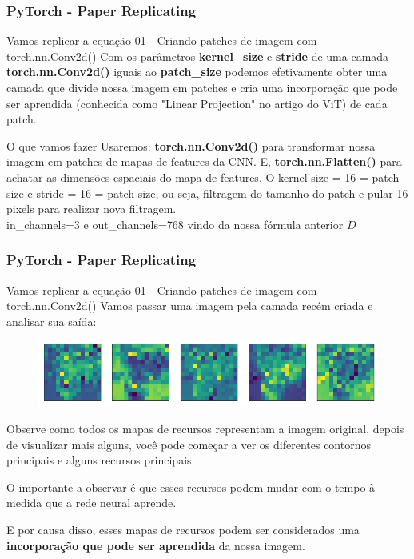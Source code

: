 \documentclass{beamer}
\begin{document}
\begin{frame}
	\frametitle{PyTorch - Paper Replicating}
	\begin{block}{Vamos replicar a equação 01 - Criando patches de imagem com torch.nn.Conv2d()}
		Com os parâmetros \textbf{kernel\_size} e \textbf{stride} de uma camada \textbf{torch.nn.Conv2d()} iguais ao \textbf{patch\_size} podemos efetivamente obter uma camada que divide nossa imagem em patches e cria uma incorporação que pode ser aprendida (conhecida como "Linear Projection" no artigo do ViT) de cada patch.
	\end{block}
	\begin{block}{O que vamos fazer}
		Usaremos: \textbf{torch.nn.Conv2d()} para transformar nossa imagem em patches de mapas de features da CNN. E, \textbf{torch.nn.Flatten()} para achatar as dimensões espaciais do mapa de features. 
		O kernel size  = 16 = patch size e stride = 16 = patch size, ou seja, filtragem do tamanho do patch e pular 16 pixels para realizar nova filtragem. \\
		in\_channels=3 e out\_channels=768 vindo da nossa fórmula anterior $D$
		
	\end{block}
\end{frame}
\begin{frame}
	\frametitle{PyTorch - Paper Replicating}
	\begin{block}{Vamos replicar a equação 01 - Criando patches de imagem com torch.nn.Conv2d()}
		Vamos passar uma imagem pela camada recém criada e analisar sua saída:
		\begin{figure}
			\centering
			\includegraphics[width=0.7\linewidth]{figures/vit_patch_cnn_out01}
		\end{figure}
		
		Observe como todos os mapas de recursos representam a imagem original, depois de visualizar mais alguns, você pode começar a ver os diferentes contornos principais e alguns recursos principais.
		
		O importante a observar é que esses recursos podem mudar com o tempo à medida que a rede neural aprende.
		
		E por causa disso, esses mapas de recursos podem ser considerados uma \textbf{incorporação que pode ser aprendida} da nossa imagem.

	\end{block}
\end{frame}
\end{document}
